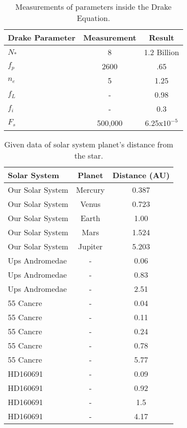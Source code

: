 \documentclass{article}
\begin{document}
\begin{table}[h]
\begin{center}
\begin{tabular}{l c c}
\hline
Drake Parameter & Measurement & Result\\
\hline
\hline
${N}_{*}$ & 8 & 1.2 Billion\\
${f}_{p}$ & 2600 & .65\\ 
${n}_{e}$ & 5 & 1.25\\
${f}_{L}$ & - & 0.98\\
${f}_{i}$ & - & 0.3\\
${F}_{s}$ & 500,000 & 6.25x${10}^{-5}$\\
\hline
\end{tabular}
\end{center}
\caption{Measurements of parameters inside the Drake Equation.\label{tab:drake}}
\end{table}

\begin{table}[h]
\begin{center}
\begin{tabular}{l c c}
\hline
Solar System & Planet & Distance (AU)\\
\hline
\hline
Our Solar System & Mercury & 0.387\\
Our Solar System & Venus & 0.723\\
Our Solar System & Earth & 1.00\\
Our Solar System & Mars & 1.524\\
Our Solar System & Jupiter & 5.203\\
Ups Andromedae & - & 0.06\\
Ups Andromedae & - & 0.83\\
Ups Andromedae & - & 2.51\\
55 Cancre & - &  0.04\\
55 Cancre & - &  0.11\\
55 Cancre & - &  0.24\\
55 Cancre & - &  0.78\\
55 Cancre & - &  5.77\\
HD160691 & - &  0.09\\
HD160691 & - &  0.92\\
HD160691 & - &  1.5\\
HD160691 & - &  4.17\\
\hline
\end{tabular}
\end{center}
\caption{Given data of solar system planet's distance from the star.\label{tab:planets}}
\end{table}
\end{document}
